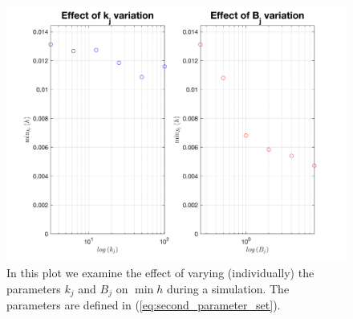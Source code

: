 \documentclass{amsart}
\theoremstyle{definition}
\theoremstyle{remark}
\numberwithin{equation}{section}
\begin{document}
\begin{figure}[h]
	\centering
	\includegraphics[width=1.0\textwidth]{figures/fig_effect_on_minh_kj_Bj}	
	\caption{\label{fig:effect_Bj_kj_minh}  In this plot we
		examine the effect of varying (individually) the parameters $k_j$ and $B_j$ on $\min{h}$ during a simulation. The parameters are defined in (\ref{eq:second_parameter_set}). }
\end{figure}





\end{document}
